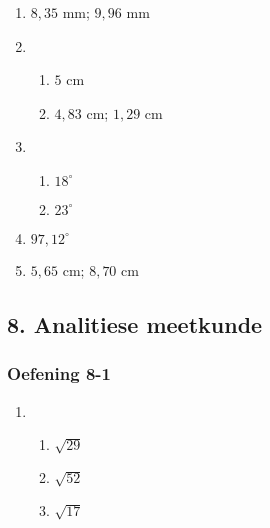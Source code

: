 {\begin{multicols}{3}
\begin{enumerate}[noitemsep, label=\textbf{\arabic*}. ]
\item $8,35$ mm; $9,96$ mm%
\item %
\begin{enumerate}[noitemsep, label=\textbf{(\alph*)} ]
\item $5$ cm%
\item $4,83$ cm; $1,29$ cm%
\end{enumerate} 
\item %
\begin{enumerate}[noitemsep, label=\textbf{(\alph*)} ] 
\item $18^{\circ}$%
\item $23^{\circ}$%
\end{enumerate} 
\item $97,12^{\circ}$%
\item $5,65$ cm; $8,70$ cm%
\end{enumerate}
\end{multicols}

\subsection* {8. Analitiese meetkunde}
\begin{multicols}{3}
\subsubsection*{Oefening 8-1} %
\begin{enumerate}[label=\textbf{\arabic*}.]
\item %
 \begin{enumerate}[noitemsep, label=\textbf{(\alph*)} ] 
\item $\sqrt{29}$%
\item $\sqrt{52}$%
\item $\sqrt{17}$%
\end{enumerate}


\end{enumerate}
\end{multicols}}
